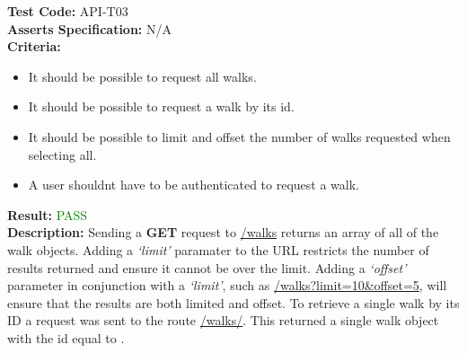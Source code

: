 \documentclass[11pt,a4paper]{report}
\begin{document}
\label{test:API-T03}
\noindent\textbf{Test Code:} API-T03\\
\textbf{Asserts Specification:} N/A \\ 
\textbf{Criteria:} \begin{itemize}
                     \item It should be possible to request all walks.
                     \item It should be possible to request a walk by its id.
                     \item It should be possible to limit and offset the number of walks requested when selecting all.
                     \item A user shouldnt have to be authenticated to request a walk.
                   \end{itemize}  
\textbf{Result:} \textcolor{green}{PASS}\\ 
\textbf{Description:} Sending a \textbf{GET} request to \url{/walks} returns an array of all of the walk objects. Adding a \textit{`limit'} paramater to the URL restricts the number of results returned and ensure it cannot be over the limit. Adding a \textit{`offset'} parameter in conjunction with a \textit{`limit'}, such as \url{/walks?limit=10&offset=5}, will ensure that the results are both limited and offset. To retrieve a single walk by its ID a request was sent to the route \url{/walks/}. This returned a single walk object with the id equal to . \\ 
\end{document}
